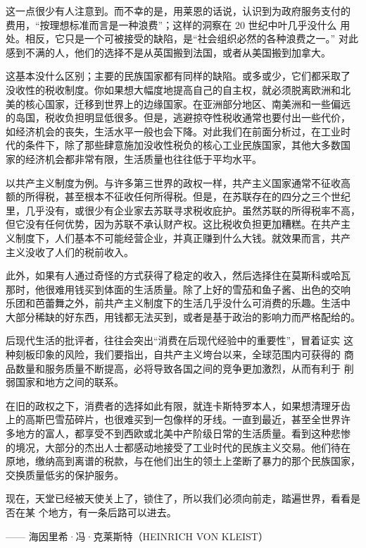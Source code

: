 这一点很少有人注意到。而不幸的是，用莱恩的话说，认识到为政府服务支付的 费用，“按理想标准而言是一种浪费”；这样的洞察在 20 世纪中叶几乎没什么 用处。相反，它只是一个可被接受的缺陷，是“社会组织必然的各种浪费之一。” 对此感到不满的人，他们的选择不是从英国搬到法国，或者从美国搬到加拿大。

这基本没什么区别；主要的民族国家都有同样的缺陷。或多或少，它们都采取了 没收性的税收制度。你如果想大幅度地提高自己的自主权，就必须脱离欧洲和北 美的核心国家，迁移到世界上的边缘国家。在亚洲部分地区、南美洲和一些偏远 的岛国，税收负担明显低很多。但是，逃避掠夺性税收通常也要付出一些代价， 如经济机会的丧失，生活水平一般也会下降。对此我们在前面分析过，在工业时  代的条件下，除了那些肆意施加没收性税负的核心工业民族国家，其他大多数国 家的经济机会都非常有限，生活质量也往往低于平均水平。

以共产主义制度为例。与许多第三世界的政权一样，共产主义国家通常不征收高 额的所得税，甚至根本不征收任何所得税。但是，在苏联存在的四分之三个世纪 里，几乎没有，或很少有企业家去苏联寻求税收庇护。虽然苏联的所得税率不高， 但它没有任何优势，因为苏联不承认财产权。这比税收负担更加糟糕。在共产主 义制度下，人们基本不可能经营企业，并真正赚到什么大钱。就效果而言，共产 主义没收了人们的税前收入。

此外，如果有人通过奇怪的方式获得了稳定的收入，然后选择住在莫斯科或哈瓦 那时，他很难用钱买到体面的生活质量。除了上好的雪茄和鱼子酱、出色的交响 乐团和芭蕾舞之外，前共产主义制度下的生活几乎没什么可消费的乐趣。生活中 大部分稀缺的好东西，用钱都无法买到，或者是基于政治的影响力而严格配给的。

后现代生活的批评者，往往会突出“消费在后现代经验中的重要性”，冒着证实 这种刻板印象的风险，我们要指出，自共产主义垮台以来，全球范围内可获得的 商品数量和服务质量不断提高，必将导致各国之间的竞争更加激烈，从而有利于 削弱国家和地方之间的联系。

在旧的政权之下，消费者的选择如此有限，就连卡斯特罗本人，如果想清理牙齿 上的高斯巴雪茄碎片，也很难买到一包像样的牙线。一直到最近，甚至全世界许 多地方的富人，都享受不到西欧或北美中产阶级日常的生活质量。看到这种悲惨 的境况，大部分的杰出人士都感动地接受了工业时代的民族主义交易。他们待在 原地，缴纳高到离谱的税款，与在他们出生的领土上垄断了暴力的那个民族国家， 交换质量低劣的保护服务。

\begin{tcolorbox}
现在，天堂已经被天使关上了，锁住了，所以我们必须向前走，踏遍世界，看看是否在某 个地方，有一条后路可以进去。
\begin{flushright}
—— 海因里希·冯·克莱斯特（HEINRICH VON KLEIST） 
\end{flushright}
\end{tcolorbox}


